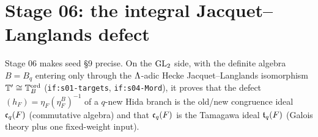 \section*{Stage 06: the integral Jacquet--Langlands defect}\label{sec:stage-06}

Stage 06 makes seed \S9 precise. On the $\mathrm{GL}_2$ side, with the definite algebra $B=B_q$ entering only through the $\Lambda$-adic
Hecke Jacquet--Langlands isomorphism $\mathbb{T}'\cong\mathbb{T}^{\mathrm{ord}}_B$ (\texttt{if:s01-targets}, \texttt{if:s04-Mord}), it proves that the
defect $(h_F)=\eta_F(\eta^B_F)^{-1}$ of a $q$-new Hida branch is the old/new congruence ideal $\mathfrak{c}_q(F)$ (commutative algebra) and
that $\mathfrak{c}_q(F)$ is the Tamagawa ideal $\mathfrak{t}_q(F)$ (Galois theory plus one fixed-weight input).

